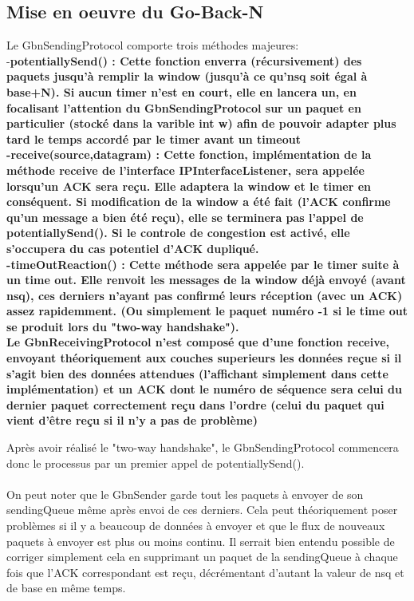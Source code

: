 \documentclass[11pt]{article}
\begin{document}
\subsection{Mise en oeuvre du Go-Back-N}
Le GbnSendingProtocol comporte trois méthodes majeures: \\
-\bfseries potentiallySend() \mdseries : Cette fonction enverra (récursivement) des paquets jusqu'à remplir la window (jusqu'à ce qu'nsq soit égal à base+N). Si aucun timer n'est en court, elle en lancera un, en focalisant l'attention du GbnSendingProtocol sur un paquet en particulier (stocké dans la varible int w) afin de pouvoir adapter plus tard le temps accordé par le timer avant un timeout \\
-\bfseries receive(source,datagram) \mdseries : Cette fonction, implémentation de la méthode receive de l'interface IPInterfaceListener, sera appelée lorsqu'un ACK sera reçu. Elle adaptera la window et le timer en conséquent. Si modification de la window a été fait (l'ACK confirme qu'un message a bien été reçu), elle se terminera pas l'appel de potentiallySend(). Si le controle de congestion est activé, elle s'occupera du cas potentiel d'ACK dupliqué. \\
-\bfseries timeOutReaction() \mdseries : Cette méthode sera appelée par le timer suite à un time out. Elle renvoit les messages de la window déjà envoyé (avant nsq), ces derniers n'ayant pas confirmé leurs réception (avec un ACK) assez rapidemment. (Ou simplement le paquet numéro -1 si le time out se produit lors du "two-way handshake").\\

Le GbnReceivingProtocol n'est composé que d'une fonction receive, envoyant théoriquement aux couches superieurs les données reçue si il s'agit bien des données attendues (l'affichant simplement dans cette implémentation) et un ACK dont le numéro de séquence sera celui du dernier paquet correctement reçu dans l'ordre (celui du paquet qui vient d'être reçu si il n'y a pas de problème)

Après avoir réalisé le "two-way handshake", le GbnSendingProtocol commencera donc le processus par un premier appel de potentiallySend(). \\ \\
On peut noter que le GbnSender garde tout les paquets à envoyer de son sendingQueue même après envoi de ces derniers. Cela peut théoriquement poser problèmes si il y a beaucoup de données à envoyer et que le flux de nouveaux paquets à envoyer est plus ou moins continu. Il serrait bien entendu possible de corriger simplement cela en supprimant un paquet de la sendingQueue à chaque fois que l'ACK correspondant est reçu, décrémentant d'autant la valeur de nsq et de base en même temps.
\end{document}
